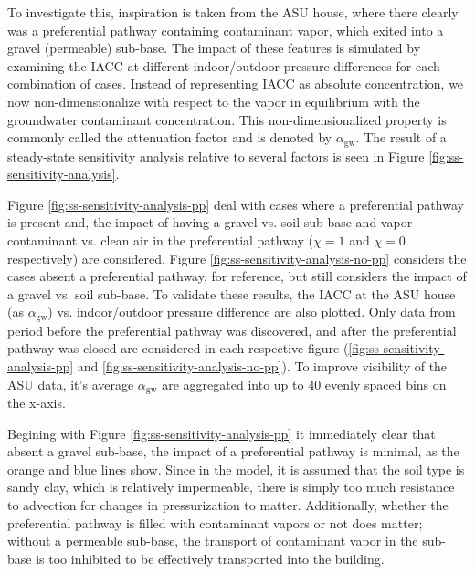 \documentclass[journal=esthag,manuscript=article]{achemso}
\begin{document}
To investigate this, inspiration is taken from the ASU house, where there clearly was a preferential pathway containing contaminant vapor, which exited into a gravel (permeable) sub-base.
The impact of these features is simulated by examining the IACC at different indoor/outdoor pressure differences for each combination of cases.
Instead of representing IACC as absolute concentration, we now non-dimensionalize with respect to the vapor in equilibrium with the groundwater contaminant concentration.
This non-dimensionalized property is commonly called the attenuation factor and is denoted by $\alpha_\mathrm{gw}$.
The result of a steady-state sensitivity analysis relative to several factors is seen in Figure \ref{fig:ss-sensitivity-analysis}.\par

Figure \ref{fig:ss-sensitivity-analysis-pp} deal with cases where a preferential pathway is present and, the impact of having a gravel vs. soil sub-base and vapor contaminant vs. clean air in the preferential pathway ($\chi=1$ and $\chi=0$ respectively) are considered.
Figure \ref{fig:ss-sensitivity-analysis-no-pp} considers the cases absent a preferential pathway, for reference, but still considers the impact of a gravel vs. soil sub-base.
To validate these results, the IACC at the ASU house (as $\alpha_\mathrm{gw}$) vs. indoor/outdoor pressure difference are also plotted.
Only data from period before the preferential pathway was discovered, and after the preferential pathway was closed are considered in each respective figure (\ref{fig:ss-sensitivity-analysis-pp} and \ref{fig:ss-sensitivity-analysis-no-pp}).
To improve visibility of the ASU data, it's average $\alpha_\mathrm{gw}$ are aggregated into up to 40 evenly spaced bins on the x-axis.\par

Begining with Figure \ref{fig:ss-sensitivity-analysis-pp} it immediately clear that absent a gravel sub-base, the impact of a preferential pathway is minimal, as the orange and blue lines show.
Since in the model, it is assumed that the soil type is sandy clay, which is relatively impermeable, there is simply too much resistance to advection for changes in pressurization to matter.
Additionally, whether the preferential pathway is filled with contaminant vapors or not does matter; without a permeable sub-base, the transport of contaminant vapor in the sub-base is too inhibited to be effectively transported into the building.\par
\end{document}
